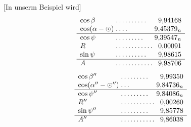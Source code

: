 [In unserm Beispiel wird]
\[
\begin{array}{l@{\;}l@{\;}r}
\cos\beta&\mathord{.}\,\mathord{.}\,\mathord{.}\,\mathord{.}\,\mathord{.}\,\mathord{.}\,\mathord{.}\,\mathord{.}\,\mathord{.}\,\mathord{.}&9{,}94168\\
\cos(\alpha-\odot)&\mathord{.}\,\mathord{.}\,\mathord{.}\,\mathord{.}&9{,}45379_n\\\hline
\cos\psi&\mathord{.}\,\mathord{.}\,\mathord{.}\,\mathord{.}\,\mathord{.}\,\mathord{.}\,\mathord{.}\,\mathord{.}\,\mathord{.}&9{,}39547_n\\
R&\mathord{.}\,\mathord{.}\,\mathord{.}\,\mathord{.}\,\mathord{.}\,\mathord{.}\,\mathord{.}\,\mathord{.}\,\mathord{.}\,\mathord{.}\,\mathord{.}\,\mathord{.}&0{,}00091\\
\sin\psi&\mathord{.}\,\mathord{.}\,\mathord{.}\,\mathord{.}\,\mathord{.}\,\mathord{.}\,\mathord{.}\,\mathord{.}\,\mathord{.}\,\mathord{.}&9{,}98615\\\hline
A&\mathord{.}\,\mathord{.}\,\mathord{.}\,\mathord{.}\,\mathord{.}\,\mathord{.}\,\mathord{.}\,\mathord{.}\,\mathord{.}\,\mathord{.}\,\mathord{.}\,\mathord{.}&9{,}98706
\end{array}
\]
\[
\begin{array}{l@{\;}l@{\;}r}
\cos\beta''&\mathord{.}\,\mathord{.}\,\mathord{.}\,\mathord{.}\,\mathord{.}\,\mathord{.}\,\mathord{.}\,\mathord{.}\,\mathord{.}&9{,}99350\\
\cos(\alpha''-\odot'')&\mathord{.}\,\mathord{.}\,\mathord{.}&9{,}84736_n\\\hline
\cos\psi''&\mathord{.}\,\mathord{.}\,\mathord{.}\,\mathord{.}\,\mathord{.}\,\mathord{.}\,\mathord{.}\,\mathord{.}\,\mathord{.}&9{,}84086_n\\
R''&\mathord{.}\,\mathord{.}\,\mathord{.}\,\mathord{.}\,\mathord{.}\,\mathord{.}\,\mathord{.}\,\mathord{.}\,\mathord{.}\,\mathord{.}\,\mathord{.}&0{,}00260\\
\sin\psi''&\mathord{.}\,\mathord{.}\,\mathord{.}\,\mathord{.}\,\mathord{.}\,\mathord{.}\,\mathord{.}\,\mathord{.}\,\mathord{.}&9{,}85778\\\hline
A''&\mathord{.}\,\mathord{.}\,\mathord{.}\,\mathord{.}\,\mathord{.}\,\mathord{.}\,\mathord{.}\,\mathord{.}\,\mathord{.}\,\mathord{.}\,\mathord{.}&9{,}86038
\end{array}
\]
